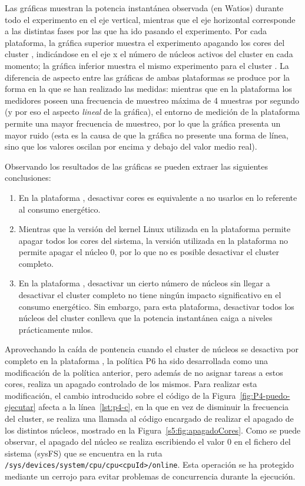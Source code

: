Las gráficas muestran la potencia instantánea observada (en Watios) durante todo el
experimento en el eje vertical, mientras que el eje horizontal corresponde
a las distintas fases por las que ha ido pasando el experimento. Por cada
plataforma, la gráfica superior muestra el experimento apagando los cores
del cluster \BIG, indicándose en el eje x el número de núcleos activos del
cluster en cada momento; la gráfica inferior muestra el mismo
experimento para el cluster \LITTLE. La diferencia de aspecto entre las
gráficas de ambas plataformas se produce por la forma en la que se han
realizado las medidas: mientras que en la plataforma \odroid los medidores
poseen una frecuencia de muestreo máxima de 4 muestras por segundo (y por
eso el aspecto \emph{lineal} de la gráfica), el entorno de medición de la
plataforma \juno permite una mayor frecuencia de muestreo, por lo que la
gráfica presenta un mayor ruido (esta es la causa de que la gráfica no
presente una forma de línea, sino que los valores oscilan por encima y
debajo del valor medio real).

Observando los resultados de las gráficas se pueden extraer las siguientes
conclusiones:

\begin{enumerate}
\item En la plataforma \juno, desactivar cores es equivalente a no usarlos
  en lo referente al consumo energético.
\item Mientras que la versión del kernel Linux utilizada en la plataforma
  \juno permite apagar todos los cores del sistema, la versión utilizada en
  la plataforma \odroid no permite apagar el núcleo 0, por lo que no es
  posible desactivar el cluster \LITTLE completo.
\item En la plataforma \odroid, desactivar un cierto número de núcleos sin
  llegar a desactivar el cluster completo no tiene ningún impacto
  significativo en el consumo energético. Sin embargo, para esta
  plataforma, desactivar todos los núcleos del cluster \BIG conlleva que 
		la potencia instantánea caiga a niveles prácticamente nulos.
\end{enumerate}


Aprovechando la caída de pontencia cuando el cluster de
núcleos \BIG se desactiva por completo en la plataforma \odroid, la política
P6 ha sido desarrollada como una modificación de la política anterior, pero
además de no asignar tareas a estos cores, realiza un apagado controlado de
los mismos. Para realizar esta modificación, el cambio introducido sobre el
código de la Figura~\ref{fig:P4-puedo-ejecutar} afecta a la
línea~\ref{lst:p4-c}, en la que en vez de disminuir la frecuencia del
cluster, se realiza una llamada al código encargado de realizar el apagado
de los distintos núcleos, mostrado en la
Figura~\ref{s5:fig:apagadoCores}. Como se puede observar, el apagado del
núcleo se realiza escribiendo el valor 0 en el fichero del sistema ({\sc sysFS}) que se
encuentra en la ruta
\texttt{/sys/devices/system/cpu/cpu<cpuId>/online}. Esta operación se ha protegido
mediante un cerrojo para evitar problemas de concurrencia
durante la ejecución.



